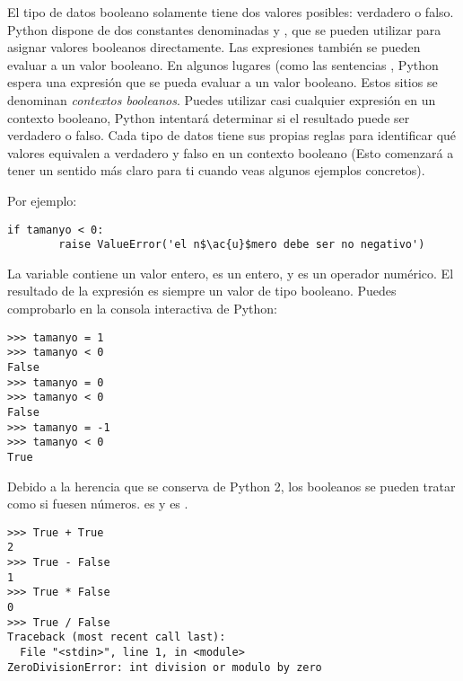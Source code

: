 
El tipo de datos booleano solamente tiene dos valores posibles: verdadero o falso. Python dispone de dos constantes denominadas  y , que se pueden utilizar para asignar valores booleanos directamente. Las expresiones también se pueden evaluar a un valor booleano. En algunos lugares (como las sentencias , Python espera una expresión que se pueda evaluar a un valor booleano. Estos sitios se denominan \emph{contextos booleanos}. Puedes utilizar casi cualquier expresión en un contexto booleano, Python intentará determinar si el resultado puede ser verdadero o falso. Cada tipo de datos tiene sus propias reglas para identificar qué valores equivalen a verdadero y falso en un contexto booleano (Esto comenzará a tener un sentido más claro para ti cuando veas algunos ejemplos concretos).

Por ejemplo:


\noindent\begin{minipage}{\textwidth}
\begin{lstlisting}[mathescape=True]
    if tamanyo < 0:
        raise ValueError('el n$\ac{u}$mero debe ser no negativo')
\end{lstlisting}
\end{minipage}

La variable  contiene un valor entero,  es un entero, y \codigo{<} es un operador numérico. El resultado de la expresión es siempre un valor de tipo booleano. Puedes comprobarlo en la consola interactiva de Python:


\noindent\begin{minipage}{\textwidth}
\begin{lstlisting}[mathescape=True]
>>> tamanyo = 1
>>> tamanyo < 0
False
>>> tamanyo = 0
>>> tamanyo < 0
False
>>> tamanyo = -1
>>> tamanyo < 0
True
\end{lstlisting}
\end{minipage}

Debido a la herencia que se conserva de Python 2, los booleanos se pueden tratar como si fuesen números.  es  y  es .

\noindent\begin{minipage}{\textwidth}
\begin{lstlisting}[mathescape=True]
>>> True + True
2
>>> True - False
1
>>> True * False
0
>>> True / False
Traceback (most recent call last):
  File "<stdin>", line 1, in <module>
ZeroDivisionError: int division or modulo by zero
\end{lstlisting}
\end{minipage}

